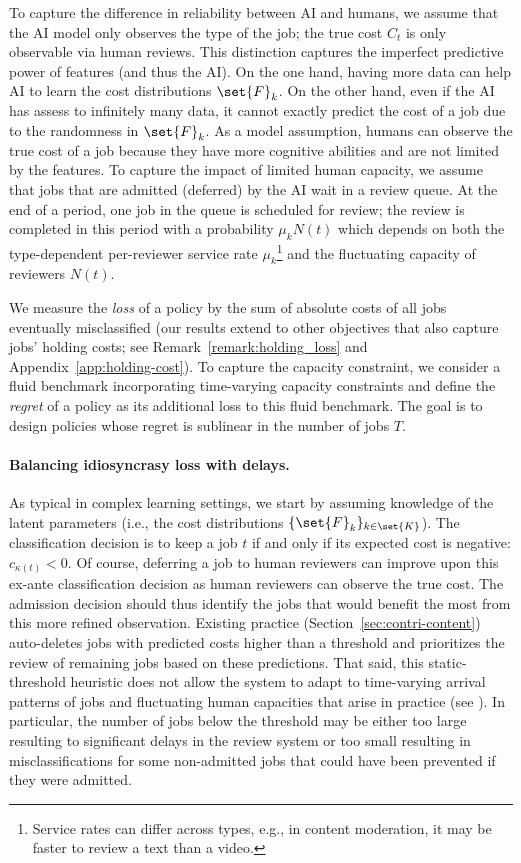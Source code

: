 To capture the difference in reliability between AI and humans, we assume that the AI model only observes the type of the job; the true cost $C_t$ is only observable via human reviews. This distinction captures the imperfect predictive power of features (and thus the AI). On the one hand, having more data can help AI to learn the cost distributions $\set{F}_k$. On the other hand, even if the AI has assess to infinitely many data, it cannot exactly predict the cost of a job due to the randomness in $\set{F}_k$. As a model assumption, humans can observe the true cost of a job because they have more cognitive abilities and are not limited by the features. To capture the impact of limited human capacity, we assume that jobs that are admitted (deferred) by the AI wait in a review queue. At the end of a period, one job in the queue is scheduled for review; the review is completed in this period with a probability $\mu_k N(t)$ which depends on both the type-dependent per-reviewer service rate $\mu_k$\footnote{Service rates can differ across types, e.g., in content moderation, it may be faster to review a text than a video.} and the fluctuating capacity of reviewers $N(t)$.

We measure the \emph{loss} of a policy by the sum of absolute costs of all jobs eventually misclassified (our results extend to other objectives that also capture jobs' holding costs; see Remark~\ref{remark:holding_loss} and Appendix~\ref{app:holding-cost}). To capture the capacity constraint, we consider a fluid benchmark incorporating time-varying capacity constraints and define the \emph{regret} of a policy as its additional loss to this fluid benchmark. The goal is to design policies whose regret is sublinear in the number of jobs $T$.

\paragraph{Balancing idiosyncrasy loss with delays.} As typical in complex learning settings, we start by assuming knowledge of the latent parameters (i.e., the cost distributions $\{\set{F}_k\}_{k \in \set{K}}$). The classification decision is to keep a job $t$ if and only if its expected cost is negative: $c_{\kappa(t)}<0$. Of course, deferring a job to human reviewers can improve upon this ex-ante classification decision as human reviewers can observe the true cost. The admission decision should thus identify the jobs that would benefit the most from this more refined observation. Existing practice (Section~\ref{sec:contri-content}) auto-deletes jobs with predicted costs higher than a threshold and prioritizes the review of remaining jobs based on these predictions. That said, this static-threshold heuristic does not allow the system to adapt to time-varying arrival patterns of jobs and fluctuating human capacities that arise in practice (see \cite[Figure~2]{makhijani2021quest}). In particular, the number of jobs below the threshold may be either too large resulting to significant delays in the review system or too small resulting in misclassifications for some non-admitted jobs that could have been prevented if they were admitted. 


